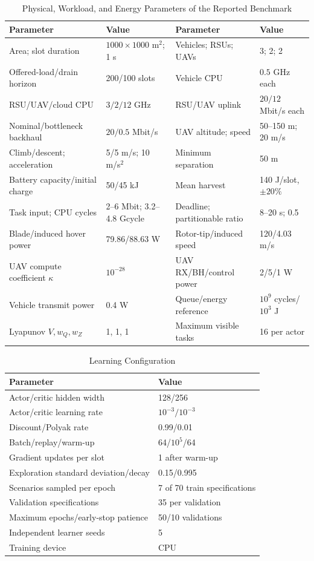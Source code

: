 \documentclass[journal]{IEEEtran}
\begin{document}
\begin{table}[!t]
\caption{Physical, Workload, and Energy Parameters of the Reported Benchmark}
\label{tab:sim}
\centering
\footnotesize
\begin{tabular}{p{}p{}p{}p{}}
\toprule
Parameter & Value & Parameter & Value\\
\midrule
Area; slot duration & $1000\times1000$ m$^2$; 1 s & Vehicles; RSUs; UAVs & 3; 2; 2\\
Offered-load/drain horizon & 200/100 slots & Vehicle CPU & $0.5$ GHz each\\
RSU/UAV/cloud CPU & $3/2/12$ GHz & RSU/UAV uplink & $20/12$ Mbit/s each\\
Nominal/bottleneck backhaul & $20/0.5$ Mbit/s & UAV altitude; speed & 50--150 m; 20 m/s\\
Climb/descent; acceleration & 5/5 m/s; 10 m/s$^2$ & Minimum separation & 50 m\\
Battery capacity/initial charge & 50/45 kJ & Mean harvest & 140 J/slot, $\pm20\%$\\
Task input; CPU cycles & 2--6 Mbit; 3.2--4.8 Gcycle & Deadline; partitionable ratio & 8--20 s; 0.5\\
Blade/induced hover power & 79.86/88.63 W & Rotor-tip/induced speed & 120/4.03 m/s\\
UAV compute coefficient $\kappa$ & $10^{-28}$ & UAV RX/BH/control power & 2/5/1 W\\
Vehicle transmit power & 0.4 W & Queue/energy reference & $10^9$ cycles/$10^3$ J\\
Lyapunov $V,w_Q,w_Z$ & 1, 1, 1 & Maximum visible tasks & 16 per actor\\
\bottomrule
\end{tabular}
\end{table}

\begin{table}[!t]
\caption{Learning Configuration}
\label{tab:learning_config}
\centering
\footnotesize
\begin{tabular}{p{}p{}}
\toprule
Parameter & Value\\
\midrule
Actor/critic hidden width & 128/256\\
Actor/critic learning rate & $10^{-3}/10^{-3}$\\
Discount/Polyak rate & 0.99/0.01\\
Batch/replay/warm-up & 64/$10^5$/64\\
Gradient updates per slot & 1 after warm-up\\
Exploration standard deviation/decay & 0.15/0.995\\
Scenarios sampled per epoch & 7 of 70 train specifications\\
Validation specifications & 35 per validation\\
Maximum epochs/early-stop patience & 50/10 validations\\
Independent learner seeds & 5\\
Training device & CPU\\
\bottomrule
\end{tabular}
\end{table}
\end{document}
